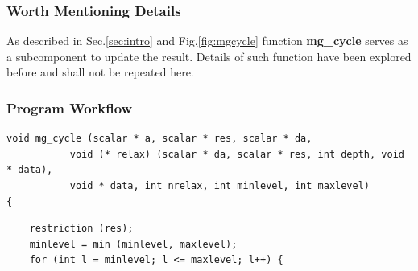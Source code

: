 \documentclass[a4paper]{article}
\newcommand{\func}[1]{\textbf{\textcolor{function}{#1}}}
\newcommand{\para}[1]{\textbf{\emph{\textcolor{para}{#1}}}}
\begin{document}
\subsubsection{Worth Mentioning Details}
As described in Sec.\ref{sec:intro} and Fig.\ref{fig:mgcycle} function \func{mg\_cycle} serves as a subcomponent to update the result. Details of such function have been explored before and shall not be repeated here.

\subsubsection{Program Workflow}
\begin{multicols}{2}
 \columnbreak
 \begin{verbatim}
void mg_cycle (scalar * a, scalar * res, scalar * da,
	       void (* relax) (scalar * da, scalar * res, int depth, void * data),
	       void * data, int nrelax, int minlevel, int maxlevel)
{
 \end{verbatim}
 
\end{multicols}

\begin{center}
\end{center}

\begin{multicols}{2}
  \columnbreak
  \begin{verbatim}
    restriction (res);
    minlevel = min (minlevel, maxlevel);
    for (int l = minlevel; l <= maxlevel; l++) {
  \end{verbatim}
\end{multicols}
\end{document}
